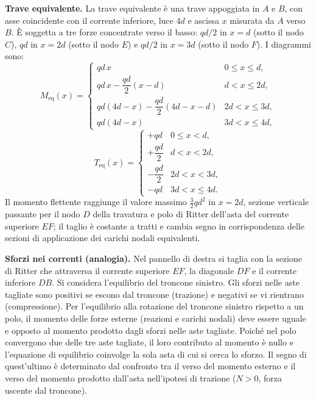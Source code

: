 \begin{esempio}
\begin{svolgimento}
		\noindent\textbf{Trave equivalente.}
		La trave equivalente è una trave appoggiata in $A$
		e $B$, con asse coincidente con il corrente inferiore,
		luce $4d$ e ascissa $x$ misurata da $A$ verso $B$.
		È soggetta a tre forze concentrate verso il basso:
		$qd/2$ in $x=d$ (sotto il nodo $C$),
		$qd$ in $x=2d$ (sotto il nodo $E$) e
		$qd/2$ in $x=3d$ (sotto il nodo $F$).
		I diagrammi sono:
		\[
		M_\text{eq}(x) = \begin{cases}
			qd \, x & 0 \leq x \leq d, \\
			qd \, x - \dfrac{qd}{2}(x-d) & d < x \leq 2d, \\
			qd(4d-x) - \dfrac{qd}{2}(4d-x-d) & 2d < x \leq 3d, \\
			qd(4d - x) & 3d < x \leq 4d,
		\end{cases}
		\]
		\[
		T_\text{eq}(x) = \begin{cases}
			+qd & 0 \leq x < d, \\
			+\dfrac{qd}{2} & d < x < 2d, \\
			-\dfrac{qd}{2} & 2d < x < 3d, \\
			-qd & 3d < x \leq 4d.
		\end{cases}
		\]
		Il momento flettente raggiunge il valore massimo
		$\tfrac{3}{2}qd^2$ in $x = 2d$, sezione verticale
		passante per il nodo  $D$ della travatura e polo
		di Ritter dell'asta del corrente superiore  $EF$;
		il taglio è costante a tratti e cambia segno
		in corrispondenza delle sezioni di applicazione
		dei carichi nodali equivalenti.
		
		\noindent\textbf{Sforzi nei correnti (analogia).}
		Nel pannello di destra si taglia con la sezione
		di Ritter che attraversa il corrente superiore
		$EF$, la diagonale $DF$ e il corrente inferiore
		$DB$. Si considera l'equilibrio del troncone
		sinistro. Gli sforzi nelle aste tagliate sono
		positivi se escono dal troncone (trazione) e
		negativi se vi rientrano (compressione).
		Per l'equilibrio alla rotazione del troncone
		sinistro rispetto a un polo, il momento delle
		forze esterne (reazioni e carichi nodali) deve
		essere uguale e opposto al momento prodotto dagli
		sforzi nelle aste tagliate. Poiché nel polo
		convergono due delle tre aste tagliate, il loro
		contributo al momento è nullo e l'equazione di
		equilibrio coinvolge la sola asta di cui si cerca
		lo sforzo. Il segno di quest'ultimo è determinato
		dal confronto tra il verso del momento esterno
		e il verso del momento prodotto dall'asta
		nell'ipotesi di trazione ($N > 0$, forza uscente
		dal troncone).
		

\end{svolgimento}
\end{esempio}
